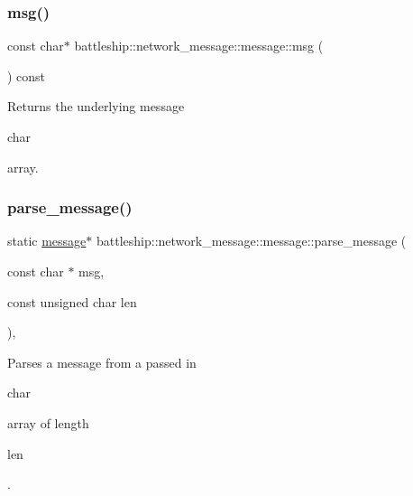 \subsubsection{\texorpdfstring{msg()}{msg()}}
{\footnotesize\ttfamily const char$\ast$ battleship\+::network\+\_\+message\+::message\+::msg (\begin{DoxyParamCaption}{ }\end{DoxyParamCaption}) const\hspace{0.3cm}{\ttfamily [inline]}}

\begin{DoxyReturn}{Returns}
the underlying message
\begin{DoxyCode}
\textcolor{keywordtype}{char} 
\end{DoxyCode}
 array. 
\end{DoxyReturn}
\mbox{\label{classbattleship_1_1network__message_1_1message_a8f87e24d9328257a0f76278a0802f86c}} 
\subsubsection{\texorpdfstring{parse\+\_\+message()}{parse\_message()}}
{\footnotesize\ttfamily static \hyperlink{classbattleship_1_1network__message_1_1message}{message}$\ast$ battleship\+::network\+\_\+message\+::message\+::parse\+\_\+message (\begin{DoxyParamCaption}\item[{const char $\ast$}]{msg,  }\item[{const unsigned char}]{len }\end{DoxyParamCaption})\hspace{0.3cm}{\ttfamily [inline]}, {\ttfamily [static]}}

Parses a message from a passed in
\begin{DoxyCode}
\textcolor{keywordtype}{char} 
\end{DoxyCode}
 array of length 
\begin{DoxyCode}
len 
\end{DoxyCode}
 .


